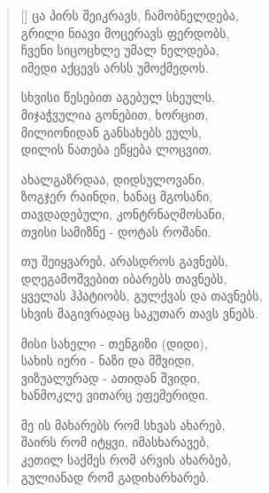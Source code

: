\documentclass{article}
\begin{document}
\settowidth{\versewidth}{Than Tycho Brahe, or Erra Pater:}

\begin{verse}[\versewidth]
    ცა პირს შეიკრავს, ჩამობნელდება, \\
    გრილი ნიავი მოცერავს ფერდობს, \\
    ჩვენი სიცოცხლე უმალ ნელდება, \\
    იმედი აქცევს არსს უმოქმედოს. \\

    \bigskip

    სხვისი წესებით აგებულ სხეულს, \\
    მიჯაჭვულია გონებით, ხორცით, \\
    მილიონიდან განსახებს ეულს, \\
    დილის ნათება ეწყება ლოცვით. \\

    \bigskip

    ახალგაზრდაა, დიდსულოვანი, \\
    ზოგჯერ რაინდი, ხანაც მგოსანი, \\
    თავდადებული, კონტრნაღმოსანი, \\
    თვისი სამიზნე - დოტას როშანი. \\

    \bigskip

    თუ შეიყვარებ, არასდროს გავნებს, \\
    დღეგამოშვებით იბარებს თავნებს, \\
    ყველას ჰპატიობს, გულქვას და თავნებს, \\
    სხვის მაგივრადაც საკუთარ თავს ვნებს. \\

    \bigskip

    მისი სახელი - თენგიზი (დიდი), \\
    სახის იერი - ნაზი და მშვიდი, \\
    ვიზუალურად - ათიდან შვიდი, \\
    ხანმოკლე ვითარც ეფემერიდი. \\

    \bigskip

    მე ის მახარებს რომ სხვას ახარებ, \\
    შაირს რომ იტყვი, იმასხარავებ, \\
    კეთილ საქმეს რომ არვის ახარბებ, \\
    გულიანად რომ გადიხარხარებ. \\

    \bigskip


\end{verse}
\end{document}
